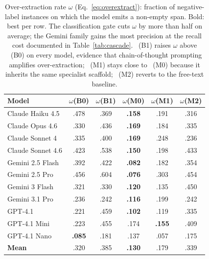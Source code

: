 \begin{table}[htbp]
  \centering
  \small
  \caption{Over-extraction rate $\omega$ (Eq.~\ref{eq:overextract}): fraction of
  negative-label instances on which the model emits a non-empty span. Bold:
  best per row. The classification gate cuts $\omega$ by more than half on
  average; the Gemini family gains the most precision at the recall cost
  documented in Table~\ref{tab:cascade}. \cfgCoT\ (B1) raises $\omega$ above
  \cfgZS\ (B0) on every model, evidence that chain-of-thought prompting
  amplifies over-extraction; \cfgMA\ (M1) stays close to \cfgCX\ (M0) because
  it inherits the same specialist scaffold; \cfgCP\ (M2) reverts to the
  free-text baseline.}
  \label{tab:omega}
  \begin{tabular*}{\linewidth}{@{\extracolsep{\fill}}lccccc@{}}
    \toprule
    \textbf{Model} & $\omega$(B0) & $\omega$(B1) & $\omega$(M0) & $\omega$(M1) & $\omega$(M2) \\
    \midrule
    Claude Haiku 4.5   & .478 & .369 & \textbf{.158} & .191 & .316 \\
    Claude Opus 4.6    & .330 & .436 & \textbf{.169} & .184 & .335 \\
    Claude Sonnet 4    & .335 & .400 & \textbf{.169} & .248 & .236 \\
    Claude Sonnet 4.6  & .423 & .538 & \textbf{.150} & .198 & .433 \\
    Gemini 2.5 Flash   & .392 & .422 & \textbf{.082} & .182 & .354 \\
    Gemini 2.5 Pro     & .456 & .604 & \textbf{.076} & .303 & .454 \\
    Gemini 3 Flash     & .321 & .330 & \textbf{.120} & .135 & .450 \\
    Gemini 3.1 Pro     & .236 & .242 & \textbf{.116} & .199 & .242 \\
    GPT-4.1            & .221 & .459 & \textbf{.102} & .119 & .335 \\
    GPT-4.1 Mini       & .223 & .455 & .174 & \textbf{.155} & .409 \\
    GPT-4.1 Nano       & \textbf{.085} & .181 & .137 & .057 & .175 \\
    \midrule
    \textbf{Mean}      & .320 & .385 & \textbf{.130} & .179 & .339 \\
    \bottomrule
  \end{tabular*}
\end{table}


